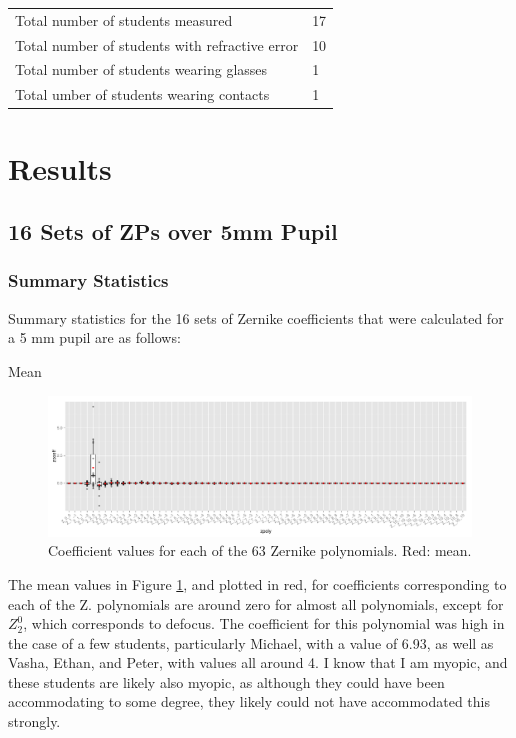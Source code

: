\documentclass{article}
\begin{document}
\begin{tabular}{ll}
Total number of students measured & 17 \\
Total number of students with refractive error & 10 \\
Total number of students wearing glasses & 1 \\
Total umber of students wearing contacts & 1 \\
\end{tabular}


\section{Results}

\subsection{16 Sets of ZPs over 5mm Pupil}

\subsubsection{Summary Statistics}
Summary statistics for the 16 sets of Zernike coefficients that were calculated for a 5 mm pupil are as follows:

Mean

\begin{figure}[h]
  \centering
    \includegraphics[width=1\textwidth]{meanbar.pdf}
  \caption{Coefficient values for each of the 63 Zernike polynomials. Red: mean.}
  \label{fig:meanbar}
\end{figure}

The mean values in Figure \ref{fig:meanbar}, and plotted in red, for coefficients corresponding to each of the Z. polynomials are around zero for almost all polynomials, except for $Z_2^0$, which corresponds to defocus. The coefficient for this polynomial was high in the case of a few students, particularly Michael, with a value of 6.93, as well as Vasha, Ethan, and Peter, with values all around 4. I know that I am myopic, and these students are likely also myopic, as although they could have been accommodating to some degree, they likely could not have accommodated this strongly.\ 
\end{document}
